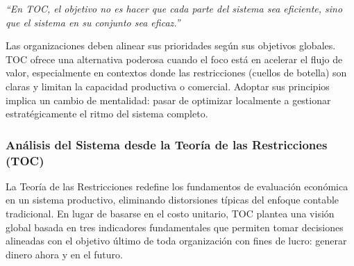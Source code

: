 \documentclass[a4paper,oneside,11pt]{article}
\begin{document}
\textit{“En TOC, el objetivo no es hacer que cada parte del sistema sea eficiente, sino que el sistema en su conjunto sea eficaz.”}

Las organizaciones deben alinear sus prioridades según sus objetivos globales. TOC ofrece una alternativa poderosa cuando el foco está en acelerar el flujo de valor, especialmente en contextos donde las restricciones (cuellos de botella) son claras y limitan la capacidad productiva o comercial. Adoptar sus principios implica un cambio de mentalidad: pasar de optimizar localmente a gestionar estratégicamente el ritmo del sistema completo.

\subsubsection{Análisis del Sistema desde la Teoría de las Restricciones (TOC)}

La Teoría de las Restricciones redefine los fundamentos de evaluación económica en un sistema productivo, eliminando distorsiones típicas del enfoque contable tradicional. En lugar de basarse en el costo unitario, TOC plantea una visión global basada en tres indicadores fundamentales que permiten tomar decisiones alineadas con el objetivo último de toda organización con fines de lucro: generar dinero ahora y en el futuro.
\end{document}
